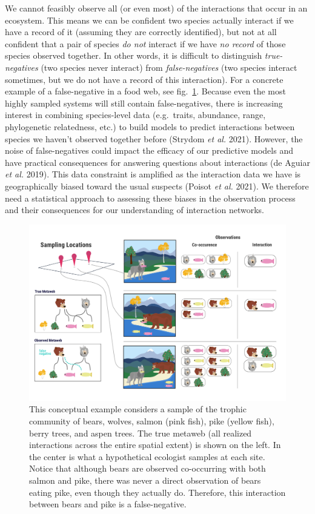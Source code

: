 \documentclass[10pt,oneside]{article}
\makeatletter
\def\maxwidth{\ifdim\Gin@nat@width>\linewidth\linewidth
\else\Gin@nat@width\fi}
\let\Oldincludegraphics\includegraphics
\renewcommand{\includegraphics}[1]{\Oldincludegraphics[width=\maxwidth]{#1}}
\makeatother
\begin{document}
We cannot feasibly observe all (or even most) of the interactions that
occur in an ecosystem. This means we can be confident two species
actually interact if we have a record of it (assuming they are correctly
identified), but not at all confident that a pair of species \emph{do
not} interact if we have \emph{no record} of those species observed
together. In other words, it is difficult to distinguish
\emph{true-negatives} (two species never interact) from
\emph{false-negatives} (two species interact sometimes, but we do not
have a record of this interaction). For a concrete example of a
false-negative in a food web, see fig.~\ref{fig:concept}. Because even
the most highly sampled systems will still contain false-negatives,
there is increasing interest in combining species-level data
(e.g.~traits, abundance, range, phylogenetic relatedness, etc.) to build
models to predict interactions between species we haven't observed
together before (Strydom \emph{et al.} 2021). However, the noise of
false-negatives could impact the efficacy of our predictive models and
have practical consequences for answering questions about interactions
(de Aguiar \emph{et al.} 2019). This data constraint is amplified as the
interaction data we have is geographically biased toward the usual
suspects (Poisot \emph{et al.} 2021). We therefore need a statistical
approach to assessing these biases in the observation process and their
consequences for our understanding of interaction networks.

\begin{figure}
\hypertarget{fig:concept}{%
\centering
\includegraphics{./figures/concept.png}
\caption{This conceptual example considers a sample of the trophic
community of bears, wolves, salmon (pink fish), pike (yellow fish),
berry trees, and aspen trees. The true metaweb (all realized
interactions across the entire spatial extent) is shown on the left. In
the center is what a hypothetical ecologist samples at each site. Notice
that although bears are observed co-occurring with both salmon and pike,
there was never a direct observation of bears eating pike, even though
they actually do. Therefore, this interaction between bears and pike is
a false-negative.}\label{fig:concept}
}
\end{figure}
\end{document}
